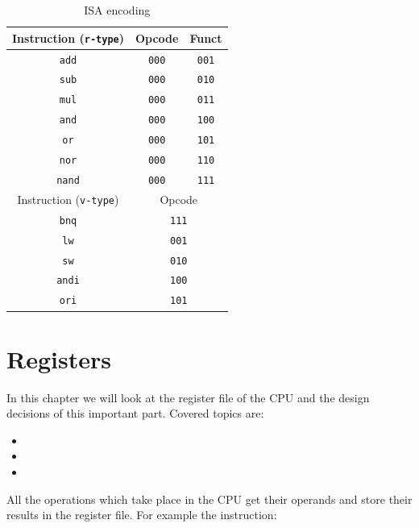 \documentclass[12pt, dvipsnames, svgnames, x11names, oneside]{book}
\newenvironment{sansserif}{\sffamily}{\normalfont}
\begin{document}
\begin{table}[h]\label{sec:table:isd-encode}
\caption{ISA encoding}
\begin{center}
\begin{tabular}{|c|c|c|}
\hline
Instruction (\texttt{r-type}) & Opcode & Funct \\
\hline
\texttt{add} & \texttt{000} & \texttt{001} \\
\hline
\texttt{sub} & \texttt{000} & \texttt{010} \\
\hline
\texttt{mul} & \texttt{000} & \texttt{011} \\
\hline
\texttt{and} & \texttt{000} & \texttt{100} \\
\hline
\texttt{or} & \texttt{000} & \texttt{101} \\
\hline
\texttt{nor} & \texttt{000} & \texttt{110} \\
\hline
\texttt{nand} & \texttt{000} & \texttt{111} \\
\hline		
\hline
Instruction (\texttt{v-type}) & \multicolumn{2}{|c|}{Opcode} \\
\hline
\texttt{bnq} & \multicolumn{2}{|c|}{\texttt{111}} \\
\hline
\texttt{lw}  & \multicolumn{2}{|c|}{\texttt{001}} \\
\hline
\texttt{sw} & \multicolumn{2}{|c|}{\texttt{010}} \\
\hline
\texttt{andi} & \multicolumn{2}{|c|}{\texttt{100}} \\
\hline
\texttt{ori} & \multicolumn{2}{|c|}{\texttt{101}} \\
\hline
\end{tabular}
\end{center}
\end{table}

\chapter{Registers}
\begin{sansserif}
In this chapter we will look at the register file of the CPU and the design decisions of this important part. Covered topics are:
\begin{itemize}
\item {}
\item {}
\item {}
\end{itemize}
\end{sansserif} 

All the operations which take place in the CPU get their operands and store their results in the register file. For example the instruction:
\end{document}
